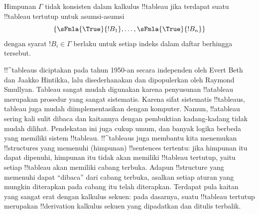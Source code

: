 \documentclass[../../../include/open-logic-section]{subfiles}
\begin{document}
Himpunan $\Gamma$ tidak konsisten dalam kalkulus !!{tableau} jika
terdapat suatu !!{tableau} tertutup untuk asumsi-asumsi
\[
\{\sFmla{\True}{!B_1}, \dots, \sFmla{\True}{!B_n}\}
\]
dengan syarat $!B_i \in \Gamma$ berlaku untuk setiap indeks dalam
daftar berhingga tersebut.

!!^{tableau}s diciptakan pada tahun 1950-an secara independen oleh
Evert Beth dan Jaakko Hintikka, lalu disederhanakan dan dipopulerkan
oleh Raymond Smullyan. Tableau sangat mudah digunakan karena
penyusunan !!a{tableau} merupakan prosedur yang sangat sistematis.
Karena sifat sistematis !!{tableau}s, tableau juga mudah
diimplementasikan dengan komputer. Namun, !!a{tableau} sering kali
sulit dibaca dan kaitannya dengan pembuktian kadang-kadang tidak mudah
dilihat. Pendekatan ini juga cukup umum, dan banyak logika berbeda yang
memiliki sistem !!{tableau}. !!^{tableau}s juga membantu kita
menemukan !!{structure}s yang memenuhi (himpunan) !!{sentence}s
tertentu: jika himpunan itu dapat dipenuhi, himpunan itu tidak akan
memiliki !!{tableau} tertutup, yaitu setiap !!{tableau} akan memiliki
cabang terbuka. Adapun !!{structure} yang memenuhi dapat ``dibaca'' dari
cabang terbuka, asalkan setiap aturan yang mungkin diterapkan pada
cabang itu telah diterapkan. Terdapat pula kaitan yang sangat erat
dengan kalkulus sekuen: pada dasarnya, suatu !!{tableau} tertutup merupakan
!!{derivation} kalkulus sekuen yang dipadatkan dan ditulis terbalik.
\end{document}
